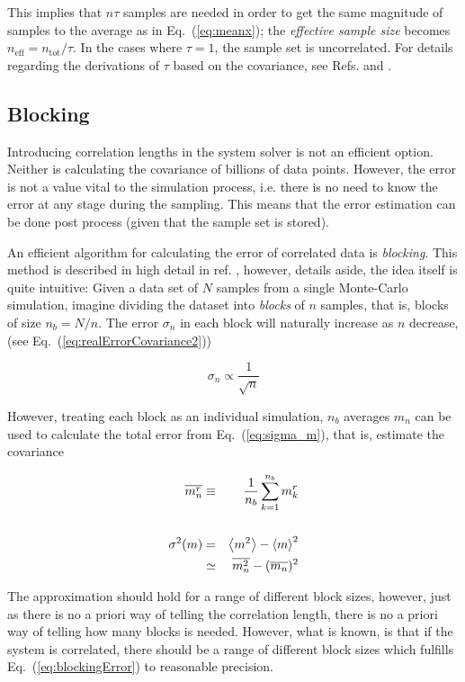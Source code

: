 This implies that $n\tau$ samples are needed in order to get the same magnitude of samples to the average as in Eq.~(\ref{eq:meanx}); the \textit{effective sample size} becomes $n_\mathrm{eff} = n_\mathrm{tot}/\tau$. In the cases where $\tau = 1$, the sample set is uncorrelated. For details regarding the derivations of $\tau$ based on the covariance, see Refs. \cite{flyvbjerg:461} and \cite{morten}.

\subsection{Blocking}

Introducing correlation lengths in the system solver is not an efficient option. Neither is calculating the covariance of billions of data points. However, the error is not a value vital to the simulation process, i.e. there is no need to know the error at any stage during the sampling. This means that the error estimation can be done post process (given that the sample set is stored).

An efficient algorithm for calculating the error of correlated data is \textit{blocking}. This method is described in high detail in ref. \cite{flyvbjerg:461}, however, details aside, the idea itself is quite intuitive: Given a data set of $N$ samples from a single Monte-Carlo simulation, imagine dividing the dataset into \textit{blocks} of $n$ samples, that is, blocks of size  $n_b=N/n$. The error $\sigma_n$ in each block will naturally increase as $n$ decrease, (see Eq.~(\ref{eq:realErrorCovariance2}))

\begin{equation}
 \sigma_n \propto \frac{1}{\sqrt{n}}
\end{equation}


However, treating each block as an individual simulation, $n_b$ averages $m_n$ can be used to calculate the total error from Eq.~(\ref{eq:sigma_m}), that is, estimate the covariance

\begin{eqnarray}
  \overline{m_n^r} &\equiv& \frac{1}{n_b}\sum_{k=1}^{n_b} m_k^r \\
\nonumber\\
  \sigma^2(m) &=& \left< m^2 \right> - \left< m \right>^2 \nonumber\\
              &\simeq& \overline{m_n^2} - (\overline{m_n})^2 \label{eq:blockingError}
\end{eqnarray}

The approximation should hold for a range of different block sizes, however, just as there is no a priori way of telling the correlation length, there is no a priori way of telling how many blocks is needed. However, what is known, is that if the system is correlated, there should be a range of different block sizes which fulfills Eq.~(\ref{eq:blockingError}) to reasonable precision. 

